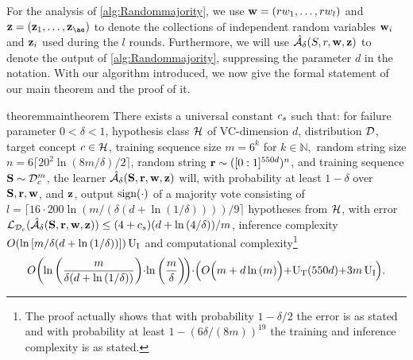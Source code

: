 For the analysis of \cref{alg:Randommajority}, we use $\mathbf{w}=(rw_{1},\ldots,rw_{l})$ and $\rz=(\rz_{1},\ldots,\rz_{æ})$ to denote the collections of independent random variables $\mathbf{w}_i$ and $\mathbf{z}_i$ used during the $l$ rounds. Furthermore, we will use $\mathcal{\hat{A}}_{\delta}(S,r,\mathbf{w},\mathbf{z})$ to denote the output of \cref{alg:Randommajority}, suppressing the parameter $ d $ in the notation. With our algorithm introduced, we now give the formal statement of our main theorem and the proof of it. 
\begin{restatable}{theorem}{maintheorem}\label{maintheorem}
  There exists a universal constant $c_s$ such that: for failure parameter $0<\delta<1$, hypothesis class $\mathcal{H}$ of VC-dimension $d$, distribution $\mathcal{D}$,  target concept $c\in \mathcal{H}$, training sequence size $ m=6^{k}$ for $k\in\mathbb{N},$ random string size $n=6\lceil20^{2}\ln{(8m/\delta)} /2\rceil$, random string $\mathbf{r}\sim ([0:1]^{550d})^{n}$, and training sequence $\mathbf{S}\sim\mathcal{D}_{c}^{m}$, the learner $ \mathcal{\hat{A}}_{\delta}(\mathbf{S},\mathbf{r},\mathbf{w},\mathbf{z}) $ will, with probability at least $ 1-\delta $ over $ \mathbf{S},\mathbf{r},\mathbf{w} $, and $ \mathbf{z} $, output $ \operatorname{sign}(\cdot) $ of a majority vote  consisting of $l=\lceil 16\cdot 200 \ln{(m/(\delta(d+\ln{\left(1/\delta \right)})) )}/9 \rceil$ hypotheses from $\mathcal{H}$, with error $  \operatorname{\mathcal{L}}_{\mathcal{D}_{c}}(\mathcal{\hat{A}}_{\delta}(\mathbf{S},\mathbf{r},\mathbf{w},\mathbf{z}))\leq (4+c_s) (d+\ln{\left(4/\delta \right)})/m $, inference complexity $ O(\ln{[m /\delta(d+\ln{\left(1/\delta \right)}) ]}) \operatorname{U_{I}} $ and computational complexity\footnote{The proof actually shows that with probability $ 1-\delta/2 $ the error is as stated and with probability at least $ 1-(6\delta/(8m))^{19} $ the training and inference complexity is as stated.  }
  \begin{align*}
    O\bigg(\negmedspace\ln{\bigg(\frac{m}{\delta(d+\ln{\left(1/\delta \right)})} \bigg)}\negmedspace\cdot\negmedspace\ln{\bigg(\frac{m}{\delta} \bigg)}\negmedspace\bigg)\negmedspace\cdot \negmedspace\Big(O\Big(m+d\ln{\left(m \right)}\Big)\negmedspace+\negmedspace\Utrain(550d)\negmedspace+\negmedspace 3m\Uinf\negmedspace\Big).
    \end{align*} 
\end{restatable}

